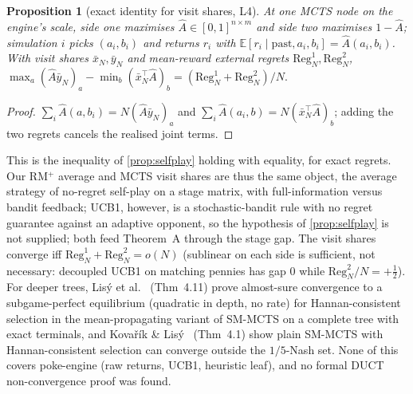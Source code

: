 \documentclass[10pt]{article}
\theoremstyle{plain}
\newtheorem{proposition}[theorem]{Proposition}
\theoremstyle{definition}
\theoremstyle{remark}
\newcommand{\E}{\mathbb{E}}
\newcommand{\Ahat}{\hat A}
\begin{document}
\begin{proposition}[exact identity for visit shares, L4]\label{prop:L4}
At one MCTS node on the engine's scale, side one maximises $\Ahat\in[0,1]^{n\times m}$ and side two maximises $1-\Ahat$; simulation $i$ picks $(a_i,b_i)$ and returns $r_i$ with $\E[r_i\mid\text{past},a_i,b_i]=\Ahat(a_i,b_i)$. With visit shares $\bar x_N,\bar y_N$ and mean-reward external regrets $\mathrm{Reg}^1_N,\mathrm{Reg}^2_N$,
$\max_a(\Ahat\bar y_N)_a-\min_b(\bar x_N^\top\Ahat)_b=(\mathrm{Reg}^1_N+\mathrm{Reg}^2_N)/N.$
\end{proposition}
\begin{proof}
$\sum_i\Ahat(a,b_i)=N(\Ahat\bar y_N)_a$ and $\sum_i\Ahat(a_i,b)=N(\bar x_N^\top\Ahat)_b$; adding the two regrets cancels the realised joint terms.
\end{proof}
This is the inequality of \cref{prop:selfplay} holding with equality, for exact regrets. Our RM$^+$ average and MCTS visit shares are thus the same object, the average strategy of no-regret self-play on a stage matrix, with full-information versus bandit feedback; UCB1, however, is a stochastic-bandit rule with no regret guarantee against an adaptive opponent, so the hypothesis of \cref{prop:selfplay} is not supplied; both feed Theorem~A through the stage gap. The visit shares converge iff $\mathrm{Reg}^1_N+\mathrm{Reg}^2_N=o(N)$ (sublinear on each side is sufficient, not necessary: decoupled UCB1 on matching pennies has gap $0$ while $\mathrm{Reg}^2_N/N=+\frac12$). For deeper trees, Lis\'y et al.~\cite{Lis13} (Thm~4.11) prove almost-sure convergence to a subgame-perfect equilibrium (quadratic in depth, no rate) for Hannan-consistent selection in the mean-propagating variant of SM-MCTS on a complete tree with exact terminals, and Kova\v{r}\'ik \& Lis\'y~\cite{KL19} (Thm~4.1) show plain SM-MCTS with Hannan-consistent selection can converge outside the $1/5$-Nash set. None of this covers poke-engine (raw returns, UCB1, heuristic leaf), and no formal DUCT non-convergence proof was found.
\end{document}
